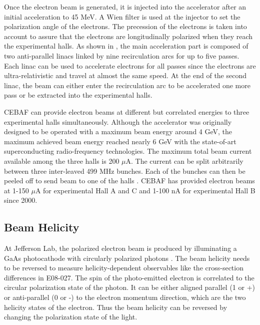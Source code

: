Once the electron beam is generated, it is injected into the accelerator after an initial acceleration to 45 MeV. A Wien filter is used at the injector to set the polarization angle of the electrons. The precession of the electrons is taken into account to assure that the electrons are longitudinally polarized when they reach the experimental halls. As shown in , the main acceleration part is composed of two anti-parallel linacs linked by nine recirculation arcs for up to five passes. Each linac can be used to accelerate electrons for all passes since the electrons are ultra-relativistic and travel at almost the same speed. At the end of the second linac, the beam can either enter the recirculation arc to be accelerated one more pass or be extracted into the experimental halls.

CEBAF can provide electron beams at different but correlated energies to three experimental halls simultaneously. Although the accelerator was originally designed to be operated with a maximum beam energy around 4 GeV, the maximum achieved beam energy reached nearly 6 GeV with the state-of-art superconducting radio-frequency technologies. The maximum total beam current available among the three halls is 200 $\mu$A. The current can be split arbitrarily between three inter-leaved 499 MHz bunches. Each of the bunches can then be peeled off to send beam to one of the halls \cite{Sulkosky2007}. CEBAF has provided electron beams at 1-150 $\mu$A for experimental Hall A and C and 1-100 nA for experimental Hall B since 2000.

\subsection{Beam Helicity}
\label{C5S1SS2}

At Jefferson Lab, the polarized electron beam is produced by illuminating a GaAs photocathode with circularly polarized photons \cite{Gross2011}. The beam helicity needs to be reversed to measure helicity-dependent observables like the cross-section differences in E08-027. The spin of the photo-emitted electron is correlated to the circular polarization state of the photon. It can be either aligned parallel (1 or +) or anti-parallel (0 or -) to the electron momentum direction, which are the two helicity states of the electron. Thus the beam helicity can be reversed by changing the polarization state of the light.

